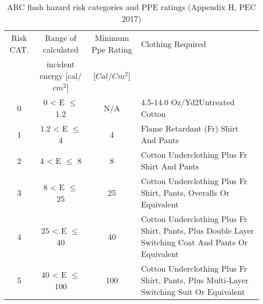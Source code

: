 \begin{table}[!htb]
	\caption{ARC flash hazard risk categories and PPE ratings (Appendix H, PEC 2017)}
	\label{tbl_ch04_elecaudit_arcflash}
	{\scriptsize
		
\begin{tabular}{c|c|c|p{6cm}}
	\hline
	Risk CAT. & Range of calculated  & Minimum Ppe Rating & Clothing Required \\ 
	& incident energy [cal/$cm^2$] & [$Cal/Cm^2$] &  \\ 
	\hline
	0 & 0 < E $\leq$1.2 & N/A & 4.5-14.0 Oz/Yd2Untreated Cotton \\ 
	1 & 1.2 < E $\leq$ 4 & 4 & Flame Retardant (Fr) Shirt And Pants \\ 
	2 & 4 < E $\leq$ 8 & 8 & Cotton Underclothing Plus Fr Shirt And Pants \\ 
	3 & 8 < E $\leq$ 25 & 25 & Cotton Underclothing Plus Fr Shirt, Pants, Overalls Or Equivalent \\ 
	4 & 25 < E $\leq$40 & 40 & Cotton Underclothing Plus Fr Shirt, Pants, Plus Double Layer Switching Coat And Pants Or Equivalent \\ 
	5 & 40 < E $\leq$ 100 & 100 & Cotton Underclothing Plus Fr Shirt, Pants, Plus Multi-Layer Switching Suit Or Equivalent \\ 
	\hline
	\end{tabular}
		
	}%
\end{table}